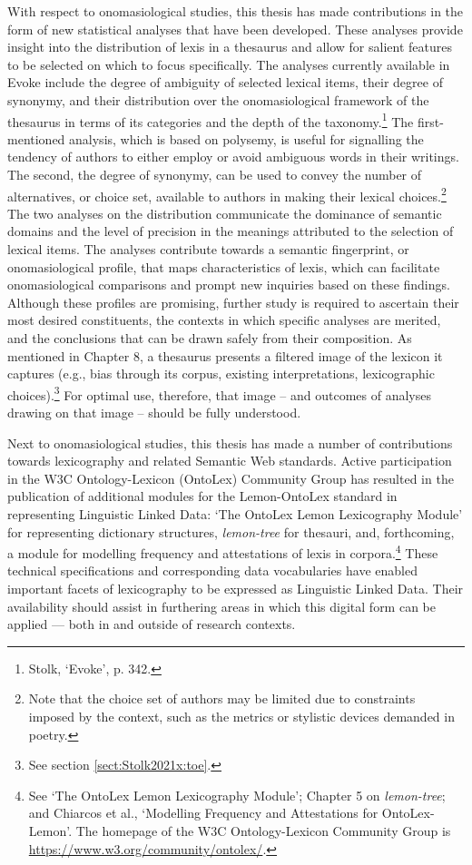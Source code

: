 With respect to onomasiological studies, this thesis has made contributions in the form of new statistical analyses that have been developed. These analyses provide insight into the distribution of lexis in a thesaurus and allow for salient features to be selected on which to focus specifically. The analyses currently available in Evoke include %
the degree of ambiguity of selected lexical items, their degree of synonymy, and their distribution over the onomasiological framework of the thesaurus in terms of its categories and the depth of the taxonomy.\footnote{Stolk, `Evoke', p. 342.} 
The first-mentioned analysis, which is based on polysemy, is useful for signalling the tendency of authors to either employ or avoid ambiguous words in their writings. 
The second, the degree of synonymy, can be used to convey the number of alternatives, or choice set, available to authors in making their lexical choices.\footnote{Note that the choice set of authors may be limited due to constraints imposed by the context, such as the metrics or stylistic devices demanded in poetry.} 
The two analyses on the distribution communicate the dominance of semantic domains and the level of precision in the meanings attributed to the selection of lexical items. 
The analyses contribute towards a semantic fingerprint, or onomasiological profile, that maps characteristics of lexis, which can facilitate onomasiological comparisons and prompt new inquiries based on these findings. Although these profiles are promising, further study is required to ascertain their most desired constituents, the contexts in which specific analyses are merited, and the conclusions that can be drawn safely from their composition. As mentioned in Chapter 8, a thesaurus presents a filtered image of the lexicon it captures (e.g., bias through its corpus, existing interpretations, lexicographic choices).\footnote{See section \ref{sect:Stolk2021x:toe}.} For optimal use, therefore, that image -- and outcomes of analyses drawing on that image -- should be fully understood.

Next to onomasiological studies, this thesis has made a number of contributions towards lexicography and related Semantic Web standards. Active participation in the W3C Ontology-Lexicon (OntoLex) Community Group has resulted in the publication of additional modules for the Lemon-OntoLex standard in representing Linguistic Linked Data: `The OntoLex Lemon Lexicography Module' for representing dictionary structures, \textit{lemon-tree} for thesauri, and, forthcoming, a module for modelling frequency and attestations of lexis in corpora.\footnote{See `The OntoLex Lemon Lexicography Module'; Chapter 5 on \textit{lemon-tree}; and Chiarcos et al., `Modelling Frequency and Attestations for OntoLex-Lemon'. The homepage of the W3C Ontology-Lexicon Community Group is \url{https://www.w3.org/community/ontolex/}.} These technical specifications and corresponding data vocabularies have enabled important facets of lexicography to be expressed as Linguistic Linked Data. Their availability %
should assist in furthering areas in which this digital form can be applied --- both in and outside of research contexts.

